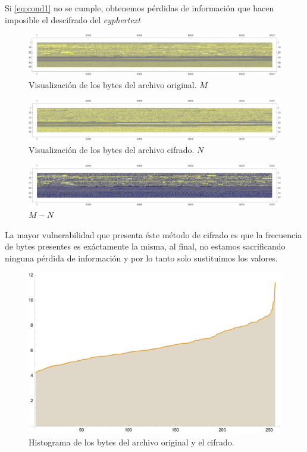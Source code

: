\documentclass[a4paper]{article}
\begin{document}
Si \eqref{eq:cond1} no se cumple, obtenemos pérdidas de información que hacen
imposible el descifrado del \textit{cyphertext}

\begin{figure}[H]
    \centering
    \includegraphics[width=\textwidth]{gr3d.pdf}
    \caption{Visualización de los bytes del archivo
original. $M$}
    \label{fig:DatosOrigM1}
\end{figure}

\begin{figure}[H]
    \centering
    \includegraphics[width=\textwidth]{bytes2.png}
    \caption{Visualización de los bytes del archivo
cifrado. $N$}
    \label{fig:DatosOrigM2}
\end{figure}

\begin{figure}[H]
    \centering
    \includegraphics[width=\textwidth]{bytes3.png}
    \caption{$M-N$}
    \label{fig:DatosOrigM3}
\end{figure}

La mayor vulnerabilidad que presenta éste método de cifrado es que la
frecuencia de bytes presentes es exáctamente la misma, al final, no estamos
sacrificando ninguna pérdida de información y por lo tanto solo sustituimos los
valores.

\begin{figure}[H]
    \centering
    \includegraphics[width=\textwidth]{historygram.png}
    \caption{Histograma de los bytes del archivo
original y el cifrado.}
    \label{fig:Histo1}
\end{figure}
\end{document}

